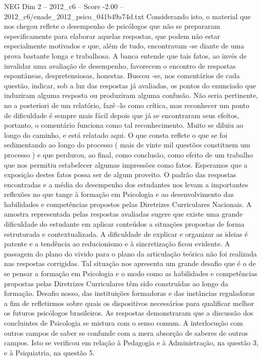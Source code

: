 \begin{textsample}{NEG Dim 2 – 2012\_c6 – Score -2.00 – 2012\_c6/enade\_2012\_psico\_041b49a74d.txt}
Considerando isto, o material que nos chegou reflete o desempenho de psicólogos que não se prepararam especificamente para elaborar aquelas respostas, que podem não estar especialmente motivados e que, além de tudo, encontravam -se diante de uma prova bastante longa e trabalhosa.
A banca entende que tais fatos, ao invés de invalidar uma avaliação de desempenho, favorecem o encontro de respostas espontâneas, despretensiosas, honestas.
Buscou -se, nos comentários de cada questão, indicar, sob a luz das respostas já avaliadas, os pontos do enunciado que induziram alguma resposta ou produziram alguma confusão.
Não seria pertinente, no a posteriori de um relatório, fazê -lo como crítica, mas reconhecer um ponto de dificuldade é sempre mais fácil depois que já se encontraram seus efeitos, portanto, o comentário funciona como tal reconhecimento.
Muito se diluiu ao longo do caminho, e está relatado aqui.
O que consta reflete o que se foi sedimentando ao longo do processo ( mais de vinte mil questões constituem um processo ) e que perdurou, ao final, como conclusão, como efeito de um trabalho que nos permitiu estabelecer algumas impressões como fatos.
Esperamos que a exposição destes fatos possa ser de algum proveito.
O padrão das respostas encontradas e a média do desempenho dos estudantes nos levam a importantes reflexões no que tange à formação em Psicologia e ao desenvolvimento das habilidades e competências propostos pelas Diretrizes Curriculares Nacionais.
A amostra representada pelas respostas avaliadas sugere que existe uma grande dificuldade do estudante em aplicar conteúdos a situações propostas de forma estruturada e contextualizada.
A dificuldade de explicar e organizar as ideias é patente e a tendência ao reducionismo e à sincretização ficou evidente.
A passagem do plano do vivido para o plano da articulação teórica não foi realizada nas respostas corrigidas.
Tal situação nos apresenta um grande desafio que é o de se pensar a formação em Psicologia e o modo como as habilidades e competências propostas pelas Diretrizes Curriculares têm sido construídas ao longo da formação.
Desafio nosso, das instituições formadoras e das instâncias reguladoras a fim de refletirmos sobre quais os dispositivos necessários para qualificar melhor os futuros psicólogos brasileiros.
As respostas demonstraram que a discussão dos concluintes de Psicologia se mistura com o senso comum.
A interlocução com outros campos de saber se confunde com a mera absorção de saberes de outros campos.
Isto se verificou em relação à Pedagogia e à Administração, na questão 3, e à Psiquiatria, na questão 5.

\end{textsample}
